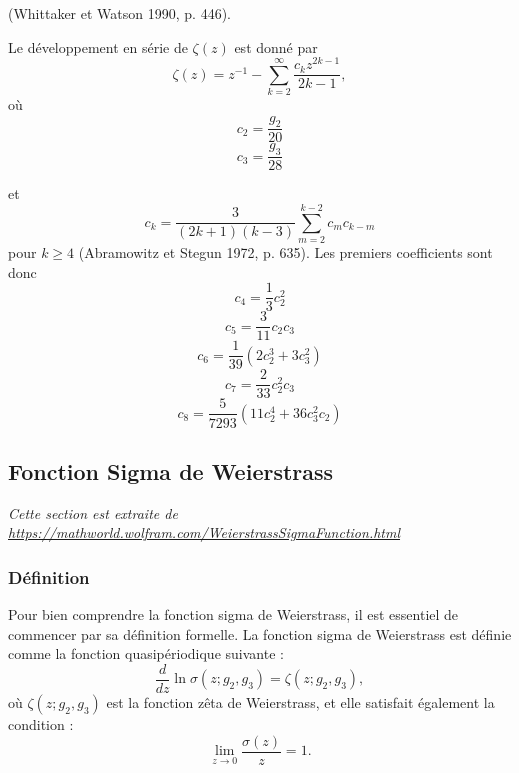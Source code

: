 \documentclass[12pt]{article}
\begin{document}
                        (Whittaker et Watson 1990, p. 446).

                        Le développement en série de $\zeta (z)$ est donné par
                        \[
                        \zeta (z) = z^{-1} - \sum_{k=2}^{\infty} \frac{c_k z^{2k-1}}{2k-1}, \tag{13}
                        \]
                        où
                        \[
                        c_2 = \frac{g_2}{20} \tag{14}
                        \]
                        \[
                        c_3 = \frac{g_3}{28} \tag{15}
                        \]

                        et
                        \[
                        c_k = \frac{3}{(2k + 1)(k - 3)} \sum_{m=2}^{k-2} c_m c_{k-m} \tag{16}
                        \]
                        pour $k \geq 4$ (Abramowitz et Stegun 1972, p. 635). Les premiers coefficients sont donc
                        \[
                        c_4 = \frac{1}{3} c_2^2 \tag{17}
                        \]
                        \[
                        c_5 = \frac{3}{11} c_2 c_3 \tag{18}
                        \]
                        \[
                        c_6 = \frac{1}{39} \left( 2 c_2^3 + 3 c_3^2 \right) \tag{19}
                        \]
                        \[
                        c_7 = \frac{2}{33} c_2^2 c_3 \tag{20}
                        \]
                        \[
                        c_8 = \frac{5}{7293} \left( 11 c_2^4 + 36 c_3^2 c_2 \right) \tag{21}
                        \]
                        \subsection{Fonction Sigma de Weierstrass}
                        \textit{Cette section est extraite de \url{https://mathworld.wolfram.com/WeierstrassSigmaFunction.html}}
                        \subsubsection{Définition}
                        Pour bien comprendre la fonction sigma de Weierstrass, il est essentiel de commencer par sa définition formelle. La fonction sigma de Weierstrass est définie comme la fonction quasipériodique suivante :
                        \[
                        \frac{d}{dz} \ln \sigma (z; g_2, g_3) = \zeta (z; g_2, g_3), \tag{1}
                        \]
                        où $\zeta (z; g_2, g_3)$ est la fonction zêta de Weierstrass, et elle satisfait également la condition :
                        \[
                        \lim_{z \to 0} \frac{\sigma (z)}{z} = 1. \tag{2}
                        \]
\end{document}
